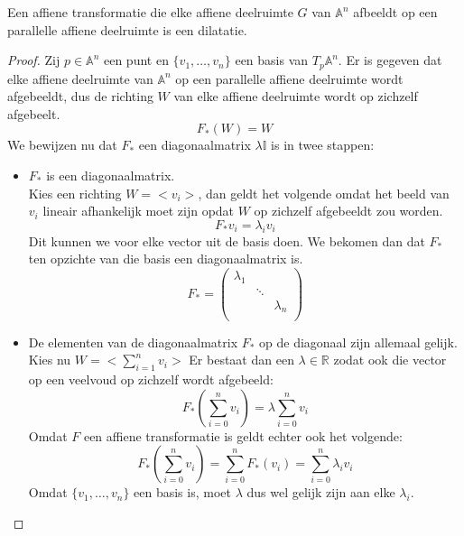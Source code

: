 \documentclass[main.tex]{subfiles}
\begin{document}
\begin{st}
  \label{st:dilatatie-parallelle-deelruimte}
  Een affiene transformatie die elke affiene deelruimte $G$ van $\mathbb{A}^{n}$ afbeeldt op een parallelle affiene deelruimte is een dilatatie.

  \begin{proof}
    Zij $p\in \mathbb{A}^{n}$ een punt en $\{v_{1},\dotsc, v_{n}\}$ een basis van $T_{p}\mathbb{A}^{n}$.
  Er is gegeven dat elke affiene deelruimte van $\mathbb{A}^{n}$ op een parallelle affiene deelruimte wordt afgebeeldt, dus de richting $W$ van elke affiene deelruimte wordt op zichzelf afgebeelt.
  \[ F_{*}(W) = W \]
  We bewijzen nu dat $F_{*}$ een diagonaalmatrix $\lambda\mathbb{I}$ is in twee stappen:
  \begin{itemize}
  \item $F_{*}$ is een diagonaalmatrix.\\
    Kies een richting $W = <v_{i}>$, dan geldt het volgende omdat het beeld van $v_{i}$ lineair afhankelijk moet zijn opdat $W$ op zichzelf afgebeeldt zou worden.
    \[ F_{*}v_{i} = \lambda_{i} v_{i} \]
    Dit kunnen we voor elke vector uit de basis doen.
    We bekomen dan dat $F_{*}$ ten opzichte van die basis een diagonaalmatrix is.
    \[
    F_{*} = 
    \begin{pmatrix}
      \lambda_{1} &         & \\
                  & \ddots & \\
                  &        & \lambda_{n}\\
    \end{pmatrix}
    \]
  \item De elementen van de diagonaalmatrix $F_{*}$ op de diagonaal zijn allemaal gelijk.\\
    Kies nu $W = <\sum_{i=1}^{n}v_{i} >$
    Er bestaat dan een $\lambda \in \mathbb{R}$ zodat ook die vector op een veelvoud op zichzelf wordt afgebeeld:
    \[ F_{*}\left(\sum_{i=0}^{n}v_{i}\right) = \lambda\sum_{i=0}^{n}v_{i} \]
    Omdat $F$ een affiene transformatie is geldt echter ook het volgende:
    \[ F_{*}\left(\sum_{i=0}^{n}v_{i}\right) = \sum_{i=0}^{n}F_{*}(v_{i}) = \sum_{i=0}^{n}\lambda_{i}v_{i}\]
    Omdat $\{v_{1},\dotsc, v_{n}\}$ een basis is, moet $\lambda$ dus wel gelijk zijn aan elke $\lambda_{i}$.
  \end{itemize}
  \end{proof}
\end{st}
\end{document}
